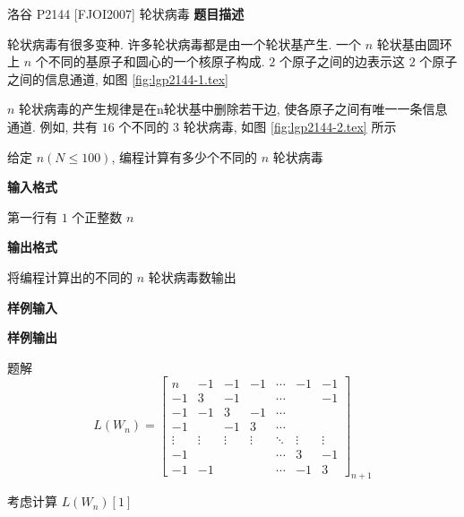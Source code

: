 \begin{frame}{洛谷 P2144 {[}FJOI2007{]} 轮状病毒}
	\textbf{题目描述}

	轮状病毒有很多变种. 许多轮状病毒都是由一个轮状基产生. 一个 \(n\) 轮状基由圆环上 \(n\) 个不同的基原子和圆心的一个核原子构成. \(2\) 个原子之间的边表示这 \(2\) 个原子之间的信息通道, 如图 \ref{fig:lgp2144-1.tex}


	\(n\) 轮状病毒的产生规律是在n轮状基中删除若干边, 使各原子之间有唯一一条信息通道. 例如, 共有 \(16\) 个不同的 \(3\) 轮状病毒, 如图 \ref{fig:lgp2144-2.tex} 所示

	给定 \(n(N\leq 100)\), 编程计算有多少个不同的 \(n\) 轮状病毒


	\textbf{输入格式}

	第一行有 \(1\) 个正整数 \(n\)

	\textbf{输出格式}

	将编程计算出的不同的 \(n\) 轮状病毒数输出

	\textbf{样例输入}


	\textbf{样例输出}

\end{frame}


\begin{frame}[fragile]{题解}
	\begin{equation}
		L(W_n) = \begin{bmatrix}
			n      & -1     & -1     & -1     & \cdots & -1     & -1     \\
			-1     & 3      & -1     &        & \cdots &        & -1     \\
			-1     & -1     & 3      & -1     & \cdots &        &        \\
			-1     &        & -1     & 3      & \cdots &        &        \\
			\vdots & \vdots & \vdots & \vdots & \ddots & \vdots & \vdots \\
			-1     &        &        &        & \cdots & 3      & -1     \\
			-1     & -1     &        &        & \cdots & -1     & 3
		\end{bmatrix}_{n+1}
	\end{equation}

	考虑计算 \(L(W_n)[1]\)
\end{frame}


